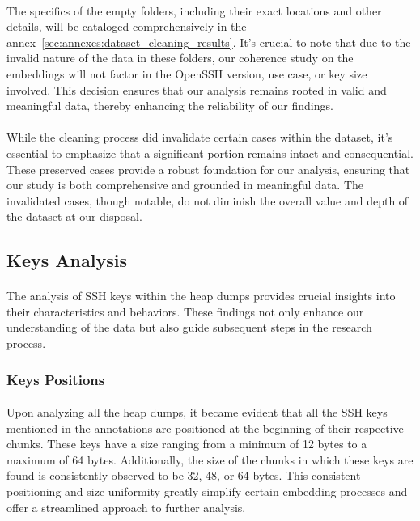             \paragraph{}The specifics of the empty folders, including their exact locations and other details, will be cataloged comprehensively in the annex~\ref{sec:annexes:dataset_cleaning_results}. It's crucial to note that due to the invalid nature of the data in these folders, our coherence study on the embeddings will not factor in the OpenSSH version, use case, or key size involved. This decision ensures that our analysis remains rooted in valid and meaningful data, thereby enhancing the reliability of our findings.

            \paragraph{}While the cleaning process did invalidate certain cases within the dataset, it's essential to emphasize that a significant portion remains intact and consequential. These preserved cases provide a robust foundation for our analysis, ensuring that our study is both comprehensive and grounded in meaningful data. The invalidated cases, though notable, do not diminish the overall value and depth of the dataset at our disposal.
    
    \subsection{Keys Analysis}\label{sec:methods:keys_analysis}

        \paragraph{}The analysis of SSH keys within the heap dumps provides crucial insights into their characteristics and behaviors. These findings not only enhance our understanding of the data but also guide subsequent steps in the research process.
    
        \subsubsection{Keys Positions}
    
        \paragraph{}Upon analyzing all the heap dumps, it became evident that all the SSH keys mentioned in the annotations are positioned at the beginning of their respective chunks. These keys have a size ranging from a minimum of 12 bytes to a maximum of 64 bytes. Additionally, the size of the chunks in which these keys are found is consistently observed to be 32, 48, or 64 bytes. This consistent positioning and size uniformity greatly simplify certain embedding processes and offer a streamlined approach to further analysis.

